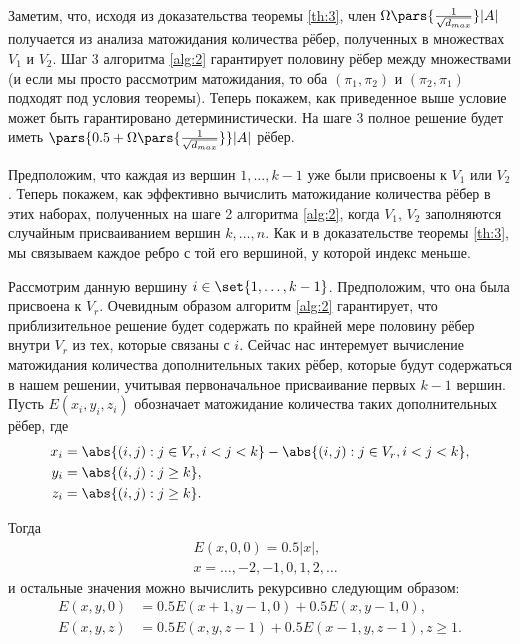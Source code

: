 \documentclass[a4paper, 12pt, oneside]{extarticle}  %
\begin{document}
Заметим, что, исходя из доказательства теоремы \ref{th:3}, член $\Omega\pars{\frac{1}{\sqrt{d_{max}}}}|A|$ получается из анализа матожидания количества рёбер, полученных в множествах $V_1$ и $V_2$. Шаг 3 алгоритма
\ref{alg:2} гарантирует половину рёбер между множествами (и если мы просто рассмотрим матожидания, то оба
$(\pi_1,\pi_2)$ и $(\pi_2,\pi_1)$ подходят под условия теоремы). Теперь покажем, как приведенное выше условие может быть гарантировано детерминистически. На шаге 3 полное решение будет иметь $\pars{0.5 + \Omega\pars{\frac{1}{\sqrt{d_{max}}}}}|A|$ рёбер.

Предположим, что каждая из вершин $1,\ldots,k-1$ уже были присвоены к $V_1$ или $V_2$. Теперь покажем, как эффективно вычислить матожидание количества рёбер в этих наборах, полученных на шаге 2 алгоритма \ref{alg:2}, когда $V_1$, $V_2$ заполняются случайным присваиванием вершин
$k,\ldots,n$. Как и в доказательстве теоремы \ref{th:3}, мы связываем каждое ребро с той его вершиной, у которой индекс меньше.

Рассмотрим данную вершину $i \in \set{1,\ldots,k-1}$. Предположим, что она была присвоена к $V_r$. Очевидным образом алгоритм \ref{alg:2} гарантирует, что приблизительное решение будет содержать по крайней мере половину рёбер внутри $V_r$ из тех, которые связаны с $i$. Сейчас нас интеремует вычисление матожидания количества дополнительных таких рёбер, которые будут содержаться в нашем решении, учитывая первоначальное присваивание первых $k-1$ вершин. Пусть $E(x_i, y_i, z_i)$ обозначает матожидание количества таких дополнительных рёбер, где
\begin{align*}
  x_i & = \abs{(i,j): j \in V_r, i < j < k} - \abs{(i,j): j \in V_r, i < j < k},
  \\
  y_i & = \abs{(i,j): j \ge k},
  \\
  z_i & = \abs{(i,j): j \ge k}.
\end{align*}

Тогда
\begin{align*}
   & E(x, 0, 0) = 0.5|x|,                \\
   & x = \ldots, -2, -1, 0, 1, 2, \ldots
\end{align*}
и остальные значения можно вычислить рекурсивно следующим образом:
\begin{align*}
  E(x,y,0) & = 0.5E(x+1, y-1, 0) + 0.5E(x, y-1, 0),          \\
  E(x,y,z) & = 0.5E(x, y, z-1) + 0.5E(x-1, y, z-1), z \ge 1.
\end{align*}
\end{document}
